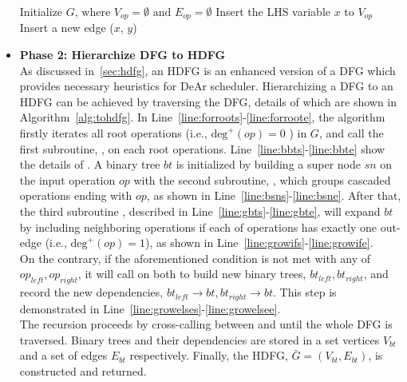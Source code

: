 \begin{itemize}
\begin{algorithm}[ht!]
\begin{algorithmic}[1]
                \State      Initialize $G \textrm{, where } V_{op} = \emptyset \textrm{ and } E_{op} = \emptyset $
                 \label{line:forssas}    
                \State      Insert the LHS variable $x$ to $V_{op}$
                \State      Insert a new edge ($x$, $y$)
                \EndFor
                \EndFor                                                         \label{line:forssae}
            \end{algorithmic}
            \label{alg:2dfg}
        \end{algorithm}

    \item \textbf{Phase 2: Hierarchize DFG to HDFG} \\\indent
        As discussed in~\ref{sec:hdfg}, an HDFG is an enhanced version of a DFG which provides necessary heuristics for DeAr scheduler.
        Hierarchizing a DFG to an HDFG can be achieved by traversing the DFG, details of which are shown in Algorithm~\ref{alg:tohdfg}.
        In Line~\ref{line:forroots}-\ref{line:forroote}, the algorithm firstly iterates all root operations (i.e., $\textrm{deg}^+(op)=0$ ) in $G$,
        and call the first subroutine, , on each root operations.
        Line~\ref{line:bbts}-\ref{line:bbte} show the details of .
        A binary tree $bt$ is initialized by building a super node $sn$ on the input operation $op$ with the second subroutine, , 
        which groups cascaded operations ending with $op$, as shown in Line~\ref{line:bsns}-\ref{line:bsne}.
        After that, the third subroutine , described in Line~\ref{line:gbts}-\ref{line:gbte}, will expand $bt$ by including neighboring operations if each of operations has exactly one out-edge (i.e., $\textrm{deg}^+(op)=1$), as shown in Line~\ref{line:growifs}-\ref{line:growife}. 
        \\\indent
        On the contrary, if the aforementioned condition is not met with any of $op_{left}, op_{right}$, 
        it will call  on both to build new binary trees, $bt_{left}, bt_{right}$,
        and record the new dependencies, $bt_{left} \rightarrow bt, bt_{right} \rightarrow bt$.
        This step is demonstrated in Line~\ref{line:growelses}-\ref{line:growelsee}. 
        \\\indent
        The recursion proceeds by cross-calling between  and  until the whole DFG is traversed.
        Binary trees and their dependencies are stored in a set vertices $V_{bt}$ and a set of edges $E_{bt}$ respectively.
        Finally, the HDFG, $\bar{G} = ( V_{bt} , E_{bt} )$, is constructed and returned.
\end{itemize}

